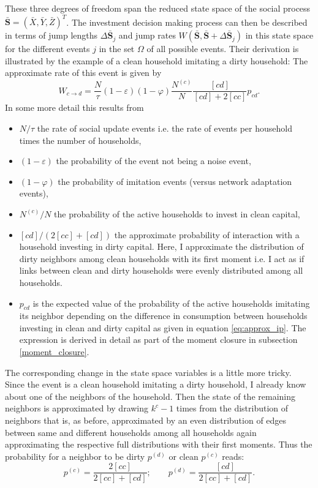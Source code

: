 These three degrees of freedom span the reduced state space of the social process $\mathbf{\bar{S}} = (\bar{X}, \bar{Y}, \bar{Z})^T$. The investment decision making process can then be described in terms of jump lengths $\Delta \mathbf{\bar{S}}_j$ and jump rates $W(\mathbf{\bar{S}},\mathbf{\bar{S}} + \Delta \mathbf{\bar{S}}_j)$ in this state space for the different events $j$ in the set $\Omega$ of all possible events.
Their derivation is illustrated by the example of a clean household imitating a dirty household: The approximate rate of this event is given by
\begin{equation}
	W_{c \rightarrow d} = \frac{N}{\tau} (1-\varepsilon) (1 - \varphi) \frac{N^{(c)}}{N}\frac{[cd]}{[cd] + 2 [cc]}p_{cd}.
	\label{eq:cdswitchingprob}
\end{equation}
In some more detail this results from
\begin{itemize}
	\item $N/\tau$ the rate of social update events i.e. the rate of events per household times the number of households,
	\item $(1-\varepsilon)$ the probability of the event not being a noise event,
	\item $(1-\varphi)$ the probability of imitation events (versus network adaptation events),
	\item $N^{(c)}/N$ the probability of the active households to invest in clean capital,
	\item $[cd]/(2[cc] + [cd])$ the approximate probability of interaction with a household investing in dirty capital. Here, I approximate the distribution of dirty neighbors among clean households with its first moment i.e. I act as if links between clean and dirty households were evenly distributed among all households. 
	\item $p_{cd}$ is the expected value of the probability of the active households imitating its neighbor depending on the difference in consumption between households investing in clean and dirty capital as given in equation \eqref{eq:approx_ip}. The expression is derived in detail as part of the moment closure in subsection \ref{moment_closure}.
\end{itemize}
The corresponding change in the state space variables is a little more tricky. Since the event is a clean household imitating a dirty household, I already know about one of the neighbors of the household. Then the state of the remaining neighbors is approximated by drawing $k^{c} - 1$ times from the distribution of neighbors that is, as before, approximated by an even distribution of edges between same and different households among all households again approximating the respective full distributions with their first moments. Thus the probability for a neighbor to be dirty $p^{(d)}$ or clean $p^{(c)}$ reads:
\begin{equation}
	p^{(c)} = \frac{2 [cc]}{2[cc] + [cd]}; \qquad p^{(d)} = \frac{[cd]}{2[cc] + [cd]}.
\label{eq:neighbordist}
\end{equation}


